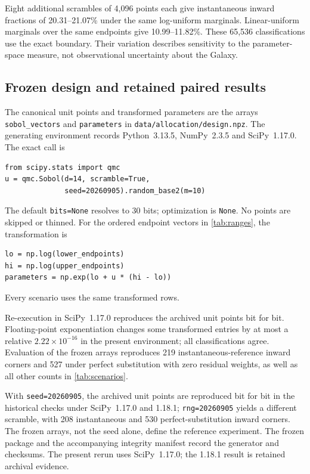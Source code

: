 \documentclass[11pt,a4paper]{article}
\theoremstyle{definition}\newtheorem{definition}{Definition}
\newcommand{\DesignLogMin}{20.31}
\newcommand{\DesignLogMax}{21.07}
\newcommand{\DesignLinearMin}{10.99}
\newcommand{\DesignLinearMax}{11.82}
\begin{document}
Eight additional scrambles of 4,096 points each give instantaneous
inward fractions of \DesignLogMin--\DesignLogMax\% under the same
log-uniform marginals. Linear-uniform marginals over the same endpoints
give \DesignLinearMin--\DesignLinearMax\%. These 65,536 classifications
use the exact boundary. Their variation describes sensitivity to the
parameter-space measure, not observational uncertainty about the Galaxy.

\subsection{Frozen design and retained paired results}
\label{supp:legacy-numerical}

The canonical unit points and transformed parameters are the arrays
\texttt{sobol\_vectors} and \texttt{parameters} in
\texttt{data/allocation/design.npz}. The generating environment records
Python~3.13.5, NumPy~2.3.5 and SciPy~1.17.0. The exact call is
\begin{verbatim}
from scipy.stats import qmc
u = qmc.Sobol(d=14, scramble=True,
              seed=20260905).random_base2(m=10)
\end{verbatim}
The default \texttt{bits=None} resolves to 30 bits; optimization is
\texttt{None}. No points are skipped or thinned. For the ordered endpoint
vectors in \cref{tab:ranges}, the transformation is
\begin{verbatim}
lo = np.log(lower_endpoints)
hi = np.log(upper_endpoints)
parameters = np.exp(lo + u * (hi - lo))
\end{verbatim}
Every scenario uses the same transformed rows.

Re-execution in SciPy~1.17.0 reproduces the archived unit points bit for
bit. Floating-point exponentiation changes some transformed entries by
at most a relative $2.22\times10^{-16}$ in the present environment;
all classifications agree. Evaluation of the frozen arrays reproduces
219 instantaneous-reference inward corners and 527 under perfect
substitution with zero residual weights, as well as all other counts
in \cref{tab:scenarios}.

With \texttt{seed=20260905}, the archived unit points are reproduced
bit for bit in the historical checks under SciPy~1.17.0 and 1.18.1;
\texttt{rng=20260905} yields a different scramble, with 208
instantaneous and 530 perfect-substitution inward corners.
The frozen arrays, not the seed alone, define the reference experiment.
The frozen package and the accompanying integrity manifest record the generator and checksums. The present rerun uses SciPy~1.17.0; the 1.18.1 result is retained archival evidence.
\end{document}
